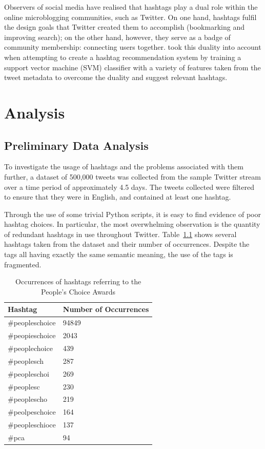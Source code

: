 \documentclass[11pt,a4paper]{report}
\begin{document}
Observers of social media have realised that hashtags play a dual role within the online microblogging communities, such as Twitter. On one hand, hashtags fulfil the design goals that Twitter created them to accomplish (bookmarking and improving search); on the other hand, however, they serve as a badge of community membership: connecting users together. \textcite{Yang:2012} took this duality into account when attempting to create a hashtag recommendation system by training a support vector machine (SVM) classifier with a variety of features taken from the tweet metadata to overcome the duality and suggest relevant hashtags.

\pagebreak

\chapter{Analysis}
\label{chap:analysis}

\section{Preliminary Data Analysis}

To investigate the usage of hashtags and the problems associated with them further, a dataset of 500,000 tweets was collected from the sample Twitter stream over a time period of approximately 4.5 days. The tweets collected were filtered to ensure that they were in English, and contained at least one hashtag.

Through the use of some trivial Python scripts, it is easy to find evidence of poor hashtag choices. In particular, the most overwhelming observation is the quantity of redundant hashtags in use throughout Twitter. Table~\ref{tbl:redundancy} shows several hashtags taken from the dataset and their number of occurrences. Despite the tags all having exactly the same semantic meaning, the use of the tags is fragmented.

\begin{table}[htpb]
\centering
\begin{tabular}{| l | l |}
    \hline
    \textbf{Hashtag} & \textbf{Number of Occurrences} \\
    \hline \hline
    \#peopleschoice & 94849 \\ \hline
    \#peopieschoice & 2043 \\ \hline
    \#peoplechoice  & 439 \\ \hline
    \#peoplesch     & 287 \\ \hline
    \#peopleschoi   & 269 \\ \hline
    \#peoplesc      & 230 \\ \hline
    \#peoplescho    & 219 \\ \hline
    \#peolpeschoice & 164 \\ \hline
    \#peopleschioce & 137 \\ \hline
    \#pca           & 94 \\ \hline
\end{tabular}
\caption{Occurrences of hashtags referring to the People's Choice Awards}
\label{tbl:redundancy}
\end{table}
\end{document}
